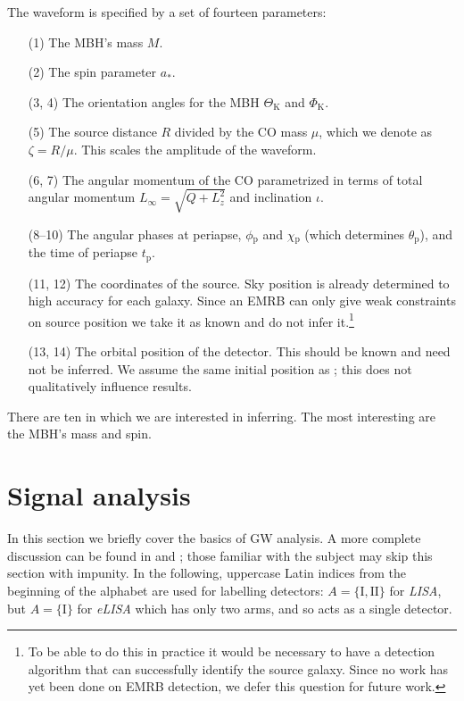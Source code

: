 \documentclass[useAMS,usedcolumn,usegraphicx,usenatbib]{mn2e}
\newcommand{\sub}[1]{\ensuremath{_\mathrm{#1}}}
\begin{document}
The waveform is specified by a set of fourteen parameters:
\begin{enumerate}
\item[(1)] The MBH's mass $M$.
\item[(2)] The spin parameter $a_\ast$.
\item[(3, 4)] The orientation angles for the MBH $\Theta\sub{K}$ and $\Phi\sub{K}$.
\item[(5)] The source distance $R$ divided by the CO mass $\mu$, which we denote as $\zeta = R/\mu$. This scales the amplitude of the waveform.
\item[(6, 7)] The angular momentum of the CO parametrized in terms of total angular momentum $L_\infty = \sqrt{Q + L_z^2}$ and inclination $\iota$.
\item[(8--10)] The angular phases at periapse, $\phi\sub{p}$  and $\chi\sub{p}$ (which determines $\theta\sub{p}$), and the time of periapse $t\sub{p}$.
\item[(11, 12)] The coordinates of the source. Sky position is already determined to high accuracy for each galaxy. Since an EMRB can only give weak constraints on source position we take it as known and do not infer it.\footnote{To be able to do this in practice it would be necessary to have a detection algorithm that can successfully identify the source galaxy. Since no work has yet been done on EMRB detection, we defer this question for future work.}
\item[(13, 14)] The orbital position of the detector. This should be known and need not be inferred. We assume the same initial position as \citet{Cutler1998}; this does not qualitatively influence results.
\end{enumerate}
There are ten in which we are interested in inferring. The most interesting are the MBH's mass and spin.

\section{Signal analysis}\label{sec:Sig}

In this section we briefly cover the basics of GW analysis. A more complete discussion can be found in \citet{Finn1992} and \citet{Cutler1994}; those familiar with the subject may skip this section with impunity. In the following, uppercase Latin indices from the beginning of the alphabet are used for labelling detectors: $A = \{\mathrm{I}, \mathrm{II}\}$ for \textit{LISA}, but $A = \{\mathrm{I}\}$ for \textit{eLISA} which has only two arms, and so acts as a single detector.
\end{document}
